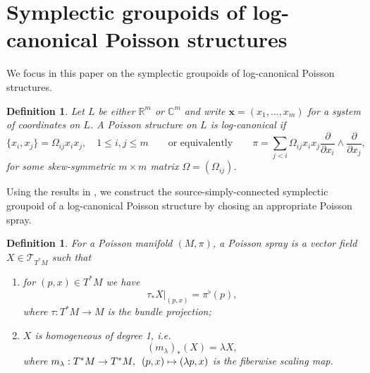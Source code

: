 \documentclass{amsart}
\newtheorem{definition}[theorem]{Definition}
\numberwithin{equation}{section}
\newcommand{\bfx}{{\boldsymbol{x}}}
\newcommand{\cT}{\mathcal{T}}
\newcommand{\CC}{\mathbb{C}}
\newcommand{\RR}{\mathbb{R}}
\begin{document}
\section{Symplectic groupoids of log-canonical Poisson structures}
\label{sec:local}
We focus in this paper on the symplectic groupoids of log-canonical Poisson structures.
\begin{definition} 
  \label{def: logPoisson}
  Let $L$ be either $\RR^m$ or $\CC^m$ and write $\bfx = (x_1, \ldots, x_m)$ for a system of coordinates on $L$.
  A Poisson structure on $L$ is \emph{log-canonical} if
  $$
    \{x_i, x_j\} = \Omega_{ij} x_ix_j, \quad 1 \leq i,j \leq m \qquad \text{or equivalently} \qquad
    \pi = \sum_{j < i} \Omega_{ij} x_ix_j\frac{\partial}{\partial x_i} \wedge \frac{\partial}{\partial x_j},
  $$
  for some skew-symmetric $m\times m$ matrix $\Omega = (\Omega_{ij})$.
\end{definition}

Using the results in \cite{CM11, CMS17}, we construct the source-simply-connected symplectic groupoid of a log-canonical Poisson structure by chosing an appropriate Poisson spray. 
\begin{definition} 
  \cite{CM11}
  For a Poisson manifold $(M, \pi)$, a \emph{Poisson spray} is a vector field $X \in \cT_{T^*M}$ such that
  \begin{enumerate}
    \item for $(p,x) \in T^*M$ we have
      \[\tau_* X|_{(p,x)} = \pi^\flat(p),\]
      where $\tau: T^*M \to M$ is the bundle projection;
    \item $X$ is homogeneous of degree 1, i.e.
      \[(m_\lambda)_*(X) = \lambda X,\]
      where $m_\lambda: T^*M \to T^*M, \enskip (p,x) \mapsto (\lambda p,x)$ is the fiberwise scaling map.
  \end{enumerate}
\end{definition}
\end{document}

